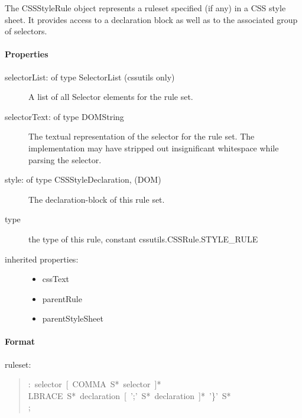 The CSSStyleRule object represents a ruleset specified (if any) in a CSS
style sheet. It provides access to a declaration block as well as to the
associated group of selectors.



\hypertarget{properties}{}
\paragraph*{Properties}
\label{properties}
\begin{description}
\item[{selectorList: of type SelectorList (cssutils only)}] \leavevmode 
A list of all Selector elements for the rule set.

\item[{selectorText: of type DOMString}] \leavevmode 
The textual representation of the selector for the rule set. The
implementation may have stripped out insignificant whitespace while
parsing the selector.

\item[{style: of type CSSStyleDeclaration, (DOM)}] \leavevmode 
The declaration-block of this rule set.

\item[{type}] \leavevmode 
the type of this rule, constant cssutils.CSSRule.STYLE{\_}RULE

\item[{inherited properties:}] \leavevmode \begin{itemize}
\item {} 
cssText

\item {} 
parentRule

\item {} 
parentStyleSheet

\end{itemize}

\end{description}



\hypertarget{format}{}
\paragraph*{Format}
\label{format}

ruleset:
\begin{quote}{\ttfamily \raggedright \noindent
:~selector~{[}~COMMA~S*~selector~{]}*~\\
LBRACE~S*~declaration~{[}~';'~S*~declaration~{]}*~'{\}}'~S*~\\
;
}\end{quote}

